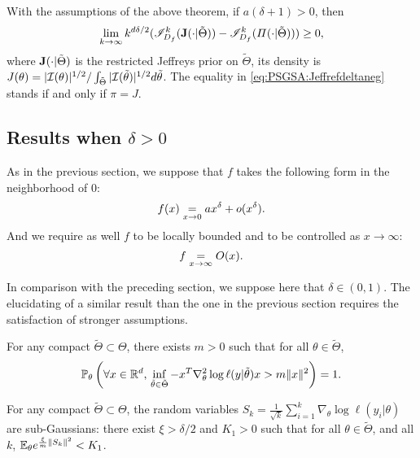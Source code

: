 \begin{prop}
    With the assumptions of the above theorem,  if $a(\delta+1)>0$, then
        \begin{equation}\label{eq:PSGSA:Jeffrefdeltaneg}
            \lim_{k\rightarrow\infty}k^{d\delta/2}(\mathscr{I}^k_{D_f}(\mathbf{J}(\cdot|\tilde\Theta))-\mathscr{I}_{D_f}^k(\varPi(\cdot|\tilde\Theta)))\geq 0 ,
        \end{equation}
    where $\mathbf{J}(\cdot|\tilde\Theta)$ is the restricted Jeffreys prior on $\tilde\Theta$, its density is $J(\theta)=|\mathcal{I}(\theta)|^{1/2}/\int_{\tilde\Theta}|\mathcal{I}(\tilde\theta)|^{1/2}d\tilde\theta$.
    The equality in \cref{eq:PSGSA:Jeffrefdeltaneg} stands if and only if 
    {$\pi=J$}.
\end{prop}







\subsection{Results when $\delta>0$}


As in the previous section, we suppose that $f$ takes the following form in the neighborhood of $0$:
\begin{equation}
    f(x) \overset{}{\underset{x\rightarrow0}{=}} a x^\delta + o(x^\delta).
\end{equation}
And we require as well $f$ to be locally bounded and to be controlled as $x\to\infty$: 
\begin{equation}
f\overset{}{\underset{x\rightarrow\infty}{=}}O(x).
\end{equation}

In comparison with the preceding section, we suppose here that $\delta\in(0,1)$.
The elucidating of a similar result than the one in the previous section requires the satisfaction of stronger assumptions.




\begin{assu}\label{assu:infeighes}
    For any compact $\tilde\Theta\subset\Theta$,
    there exists $m>0$ such that for all $\theta\in\tilde\Theta$,
    \begin{equation}
        \mathbb{P}_\theta\left(\forall x\in\mathbb{R}^d,\, \inf_{\tilde\theta\in\tilde\Theta}-x^T\nabla_\theta^2\log\ell(y|\tilde\theta)x>m\|x\|^2 \right) = 1.     
    \end{equation}
\end{assu}




\begin{assu}\label{assu:gausstailSk}
    For any compact $\tilde\Theta\subset\Theta$,
    the random variables
        $S_k=\frac{1}{\sqrt{k}}\sum_{i=1}^k\nabla_\theta\log\ell(y_i|\theta)    $
     are sub-Gaussians: there exist $\xi>\delta/2$ and $K_1>0$ such that for all $\theta\in\tilde\Theta$, and all $k$, $\mathbb{E}_\theta e^{\frac{\xi}{m}\|S_k\|^2}<K_1$.
\end{assu}



